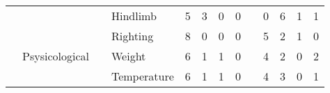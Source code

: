 \begin{frame}
\begin{table}[h!]
\begin{tabular}{lll l cccc c cccc}
&&& \textcolor{cambridgedarkorange}{Hindlimb}  &      5   &   3   &   0   &  0  &&
              0   &   6   &   1   &  1\\

&&& \textcolor{cambridgedarkorange}{Righting}  &      8   &   0   &   0   &  0  &&
              5   &   2   &   1   &  0\\

                  \midrule

&\textcolor{cambridgedarkblue}{Psysicological}

&& \textcolor{cambridgedarkorange}{Weight} &      6   &   1   &   1   &  0  &&
              4   &   2   &   0   &  2\\

&&& \textcolor{cambridgedarkorange}{Temperature}  &      6   &   1   &   1   &  0  &&
                        4   &   3   &   0   &  1\\

\end{tabular}
\end{table}


\end{frame}
